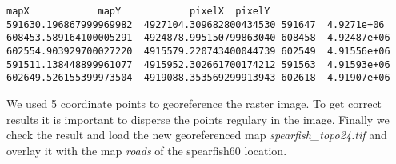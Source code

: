 \begin{verbatim}
mapX    		mapY    		pixelX  pixelY
591630.196867999969982  4927104.309682800434530 591647  4.9271e+06
608453.589164100005291  4924878.995150799863040 608458  4.92487e+06
602554.903929700027220  4915579.220743400044739 602549  4.91556e+06
591511.138448899961077  4915952.302661700174212 591563  4.91593e+06
602649.526155399973504  4919088.353569299913943 602618  4.91907e+06
\end{verbatim} 

We used 5 coordinate points to georeference the raster image. To get correct results 
it is important to disperse the points regulary in the image. Finally we check the result and load 
the new georeferenced map \textsl{spearfish\_topo24.tif} and overlay it with the map \textsl{roads} 
of the spearfish60 location.








